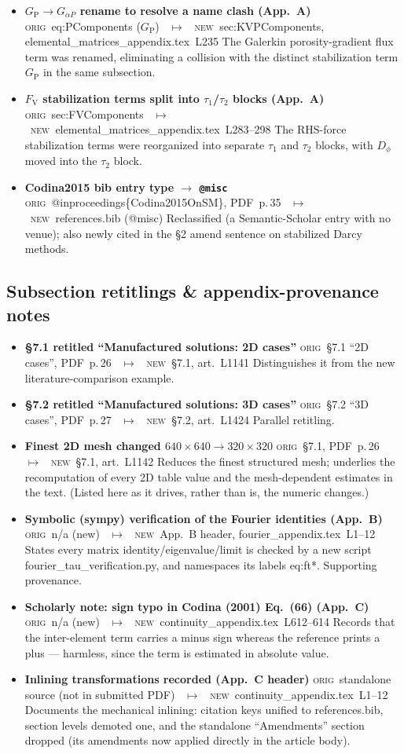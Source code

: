 \documentclass[11pt]{article}
\newcommand{\Orig}{\textcolor{origc}{\footnotesize\textsc{orig}}}
\newcommand{\New}{\textcolor{newc}{\footnotesize\textsc{new}}}
\newcommand{\code}[1]{\textcolor{newc}{\ttfamily\small #1}}
\newcommand{\pdfp}[1]{PDF~p.\,#1}
\newcommand{\artl}[1]{art.\ L#1}       %
\newcommand{\appl}[2]{#1~L#2}          %
\newcommand{\ch}[4]{%
  \item \textbf{#1}\newline
    {\footnotesize\Orig\ #2 \ \textcolor{locc}{$\longmapsto$} \ \New\ #3}\newline
    #4}
\begin{document}
\begin{itemize}
   {\code{eq:ReactionTerm}, stabilization/matrix blocks (were tentative)}
   {\appl{elemental\_matrices\_appendix.tex}{10}, 17, 30, 216, 226--266}
   {All $\varepsilon$-penalty contributions ($(\varepsilon q,p)$, $\pm(\varepsilon/\alpha)q/p$, $Q_{\varepsilon D}$, etc.) are now kept as
    accepted parts of the formulation.}
\ch{$G_{\mathrm P}\to G_{\alpha P}$ rename to resolve a name clash (App.~A)}
   {\code{eq:PComponents} ($G_{\mathrm P}$)}{\code{sec:KVPComponents}, \appl{elemental\_matrices\_appendix.tex}{235}}
   {The Galerkin porosity-gradient flux term was renamed, eliminating a collision with the distinct
    stabilization term $G_{\mathrm P}$ in the same subsection.}
\ch{$F_{\mathrm V}$ stabilization terms split into $\tau_1$/$\tau_2$ blocks (App.~A)}
   {\code{sec:FVComponents}}{\appl{elemental\_matrices\_appendix.tex}{283}--298}
   {The RHS-force stabilization terms were reorganized into separate $\tau_1$ and $\tau_2$ blocks,
    with $D_\phi$ moved into the $\tau_2$ block.}
\ch{Codina2015 bib entry type $\to$ \texttt{@misc}}
   {\code{@inproceedings\{Codina2015OnSM\}}, \pdfp{35}}{\code{references.bib} (\code{@misc})}
   {Reclassified (a Semantic-Scholar entry with no venue); also newly cited in the \S2 amend sentence
    on stabilized Darcy methods.}
\end{itemize}

\subsection{Subsection retitlings \& appendix-provenance notes}
\begin{itemize}
\ch{\S7.1 retitled ``Manufactured solutions: 2D cases''}
   {\S7.1 ``2D cases'', \pdfp{26}}{\S7.1, \artl{1141}}
   {Distinguishes it from the new literature-comparison example.}
\ch{\S7.2 retitled ``Manufactured solutions: 3D cases''}
   {\S7.2 ``3D cases'', \pdfp{27}}{\S7.2, \artl{1424}}{Parallel retitling.}
\ch{Finest 2D mesh changed $640{\times}640\to320{\times}320$}
   {\S7.1, \pdfp{26}}{\S7.1, \artl{1142}}
   {Reduces the finest structured mesh; underlies the recomputation of every 2D table value and the
    mesh-dependent estimates in the text. (Listed here as it drives, rather than is, the numeric
    changes.)}
\ch{Symbolic (sympy) verification of the Fourier identities (App.~B)}
   {n/a (new)}{App.~B header, \appl{fourier\_appendix.tex}{1}--12}
   {States every matrix identity/eigenvalue/limit is checked by a new script
    \code{fourier\_tau\_verification.py}, and namespaces its labels \code{eq:ft*}. Supporting
    provenance.}
\ch{Scholarly note: sign typo in Codina (2001) Eq.~(66) (App.~C)}
   {n/a (new)}{\appl{continuity\_appendix.tex}{612}--614}
   {Records that the inter-element term carries a minus sign whereas the reference prints a plus ---
    harmless, since the term is estimated in absolute value.}
\ch{Inlining transformations recorded (App.~C header)}
   {standalone source (not in submitted PDF)}{\appl{continuity\_appendix.tex}{1}--12}
   {Documents the mechanical inlining: citation keys unified to \code{references.bib}, section levels
    demoted one, and the standalone ``Amendments'' section dropped (its amendments now applied directly
    in the article body).}
\end{itemize}
\end{document}
